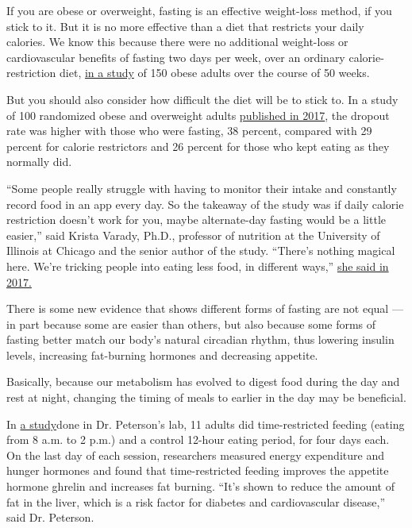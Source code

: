If you are obese or overweight, fasting is an effective weight-loss
method, if you stick to it. But it is no more effective than a diet that
restricts your daily calories. We know this because there were no
additional weight-loss or cardiovascular benefits of fasting two days
per week, over an ordinary calorie-restriction diet,
\href{https://theconversation.com/intermittent-fasting-is-no-better-than-conventional-dieting-for-weight-loss-new-study-finds-107829}{in
a study} of 150 obese adults over the course of 50 weeks.

But you should also consider how difficult the diet will be to stick to.
In a study of 100 randomized obese and overweight adults
\href{https://jamanetwork.com/journals/jamainternalmedicine/fullarticle/2623528}{published
in 2017}, the dropout rate was higher with those who were fasting, 38
percent, compared with 29 percent for calorie restrictors and 26 percent
for those who kept eating as they normally did.

``Some people really struggle with having to monitor their intake and
constantly record food in an app every day. So the takeaway of the study
was if daily calorie restriction doesn't work for you, maybe
alternate-day fasting would be a little easier,'' said Krista Varady,
Ph.D., professor of nutrition at the University of Illinois at Chicago
and the senior author of the study. ``There's nothing magical here.
We're tricking people into eating less food, in different ways,''
\href{https://www.nytimes3xbfgragh.onion/2017/05/03/well/eat/fasting-offers-no-special-weight-loss-benefits.html}{she
said in 2017.}

There is some new evidence that shows different forms of fasting are not
equal --- in part because some are easier than others, but also because
some forms of fasting better match our body's natural circadian rhythm,
thus lowering insulin levels, increasing fat-burning hormones and
decreasing appetite.

Basically, because our metabolism has evolved to digest food during the
day and rest at night, changing the timing of meals to earlier in the
day may be beneficial.

In \href{https://www.ncbi.nlm.nih.gov/pubmed/31339000}{a study}done in
Dr. Peterson's lab, 11 adults did time-restricted feeding (eating from 8
a.m. to 2 p.m.) and a control 12-hour eating period, for four days each.
On the last day of each session, researchers measured energy expenditure
and hunger hormones and found that time-restricted feeding improves the
appetite hormone ghrelin and increases fat burning. ``It's shown to
reduce the amount of fat in the liver, which is a risk factor for
diabetes and cardiovascular disease,'' said Dr. Peterson.

